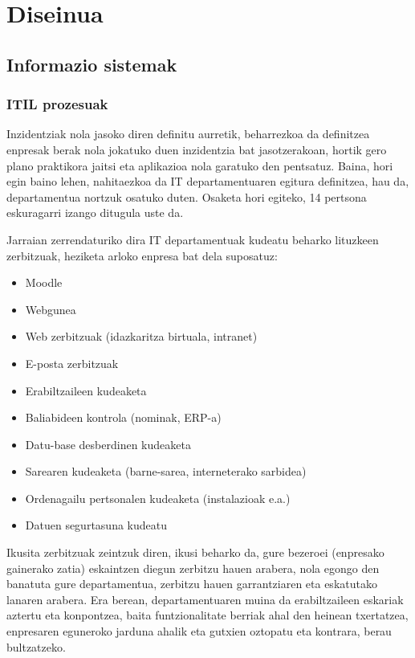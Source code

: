 \section{Diseinua}

\subsection{Informazio sistemak}
\label{sec:dinf}
\subsubsection{ITIL prozesuak}
Inzidentziak nola jasoko diren definitu aurretik, beharrezkoa da definitzea enpresak berak nola jokatuko duen inzidentzia bat jasotzerakoan, hortik gero plano praktikora jaitsi eta aplikazioa nola garatuko den pentsatuz. Baina, hori egin baino lehen, nahitaezkoa da IT departamentuaren egitura definitzea, hau da, departamentua nortzuk osatuko duten. Osaketa hori egiteko, 14 pertsona eskuragarri izango ditugula uste da.

Jarraian zerrendaturiko dira IT departamentuak kudeatu beharko lituzkeen zerbitzuak, heziketa arloko enpresa bat dela suposatuz:

\begin{itemize}
 \item Moodle
 \item Webgunea
 \item Web zerbitzuak (idazkaritza birtuala, intranet)
 \item E-posta zerbitzuak
 \item Erabiltzaileen kudeaketa
 \item Baliabideen kontrola (nominak, ERP-a)
 \item Datu-base desberdinen kudeaketa
 \item Sarearen kudeaketa (barne-sarea, interneterako sarbidea)
 \item Ordenagailu pertsonalen kudeaketa (instalazioak e.a.)
 \item Datuen segurtasuna kudeatu
\end{itemize}

Ikusita zerbitzuak zeintzuk diren, ikusi beharko da, gure bezeroei (enpresako gainerako zatia) eskaintzen diegun zerbitzu hauen arabera, nola egongo den banatuta gure departamentua, zerbitzu hauen garrantziaren eta eskatutako lanaren arabera. Era berean, departamentuaren muina da erabiltzaileen eskariak aztertu eta konpontzea, baita funtzionalitate berriak ahal den heinean txertatzea, enpresaren eguneroko jarduna ahalik eta gutxien oztopatu eta kontrara, berau bultzatzeko.

